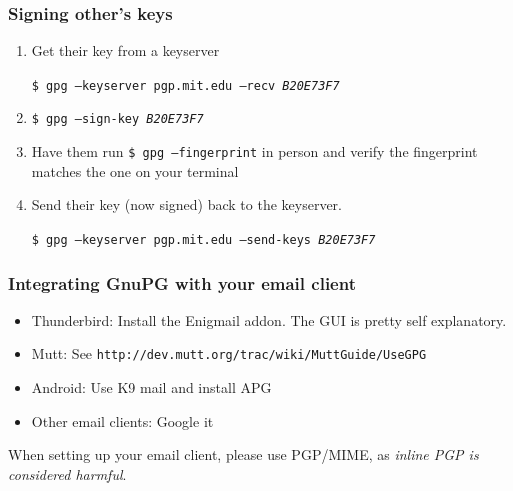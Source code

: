 \documentclass{beamer}
\begin{document}
\begin{frame}
    \frametitle{Signing other's keys}
    \begin{enumerate}[<+->]
        \item Get their key from a keyserver\par
            \texttt{\small \$ gpg --keyserver pgp.mit.edu --recv \emph{B20E73F7}}
        \item \texttt{\$ gpg --sign-key \emph{B20E73F7}}
        \item Have them run \texttt{\$ gpg --fingerprint} in person and verify
            the fingerprint matches the one on your terminal
        \item Send their key (now signed) back to the keyserver.\par
            \texttt{\small \$ gpg --keyserver pgp.mit.edu --send-keys \emph{B20E73F7}}
    \end{enumerate}
\end{frame}

\begin{frame}
    \frametitle{Integrating GnuPG with your email client}
    \begin{itemize}
        \item Thunderbird: Install the Enigmail addon. The GUI is pretty self
            explanatory.
        \item Mutt: See \texttt{http://dev.mutt.org/trac/wiki/MuttGuide/UseGPG}
        \item Android: Use K9 mail and install APG
        \item Other email clients: Google it
    \end{itemize}
    When setting up your email client, please use PGP/MIME, as
    \emph{inline PGP is considered harmful}.
\end{frame}
\end{document}
